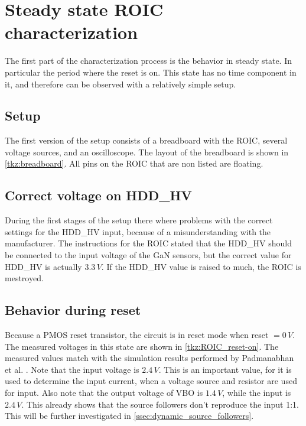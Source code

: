 \section{Steady state ROIC characterization}\label{sec:steady_state_ROIC_characerization}
The first part of the characterization process is the behavior in steady state. In particular the period where the reset is on. This state has no time component in it, and therefore can be observed with a relatively simple setup.

\subsection{Setup}\label{ssec:steady_state_setup}
The first version of the setup consists of a breadboard with the ROIC, several voltage sources, and an oscilloscope. The layout of the breadboard is shown in \cref{tkz:breadboard}. All pins on the ROIC that are non listed are floating.




\subsection{Correct voltage on HDD\_HV}
During the first stages of the setup there where problems with the correct settings for the HDD\_HV input, because of a misunderstanding with the manufacturer. The instructions for the ROIC stated that the HDD\_HV should be connected to the input voltage of the GaN sensors, but the correct value for HDD\_HV is actually $3.3\,V$. If the HDD\_HV value is raised to much, the ROIC is mestroyed.


\subsection{Behavior during reset}

Because a PMOS reset transistor, the circuit is in reset mode when reset $=0\,V$. The measured voltages in this state are shown in \cref{tkz:ROIC_reset-on}. The measured values match with the simulation results performed by Padmanabhan et al. \cite{preethi}. Note that the input voltage is $2.4\,V$. This is an important value, for it is used to determine the input current, when a voltage source and resistor are used for input. Also note that the output voltage of VBO is $1.4\,V$, while the input is $2.4\,V$. This already shows that the source followers don't reproduce the input 1:1. This will be further investigated in \cref{ssec:dynamic_source_followers}. 

